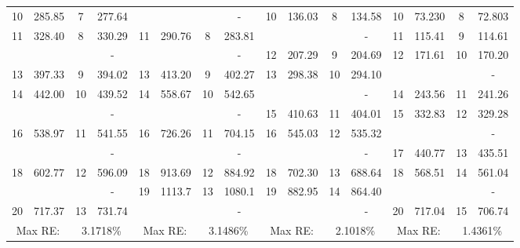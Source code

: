 \documentclass[../../main.tex]{subfiles}
\begin{document}
\begin{table}[h!]
{{\begin{tabular}{|cccc||cccc||cccc||cccc|}
		{10} & 285.85 & 7     & 277.64 & \cellcolor{lightgray}{10}    & \cellcolor{lightgray}{192.03} &      & {-} & 10    & 136.03 & 8     & 134.58 & 10    & 73.230 & 8     & 72.803 \\
		{11} & 328.40 & 8     & 330.29 & 11    & 290.76 & 8     & 283.81 & \cellcolor{lightgray}{11}    & \cellcolor{lightgray}{192.48} &       & {-} & 11    & 115.41 & 9     & 114.61 \\
		\cellcolor{lightgray}{12} & \cellcolor{lightgray}{357.08} &       & {-} & \cellcolor{lightgray}{12}    & \cellcolor{lightgray}{374.45} &       & {-} & 12    & 207.29 & 9     & 204.69 & 12    & 171.61 & 10    & 170.20 \\
		{13} & 397.33 & 9     & 394.02 & 13    & 413.20 & 9     & 402.27 & 13    & 298.38 & 10    & 294.10 & \cellcolor{lightgray}{13}    & \cellcolor{lightgray}{192.52} &       & {-} \\
		{14} & 442.00   & 10    & 439.52 & 14    & 558.67 & 10    & 542.65 & \cellcolor{lightgray}{14}    & \cellcolor{lightgray}{376.83} &       & {-} & 14    & 243.56 & 11    & 241.26 \\
		\cellcolor{lightgray}{15} & \cellcolor{lightgray}{533.71} &       & {-} & \cellcolor{lightgray}{15}    & \cellcolor{lightgray}{614.11} &       & {-} & 15    & 410.63 & 11    & 404.01 & 15    & 332.83 & 12    & 329.28 \\
		{16} & 538.97 & 11    & 541.55 & 16    & 726.26 & 11    & 704.15 & 16    & 545.03 & 12    & 535.32 & \cellcolor{lightgray}{16}    & \cellcolor{lightgray}{377.16} &       & {-} \\
		\cellcolor{lightgray}{17} & \cellcolor{lightgray}{596.06} &       & {-} & \cellcolor{lightgray}{17}    & \cellcolor{lightgray}{906.28} &       & {-} & \cellcolor{lightgray}{17}    & \cellcolor{lightgray}{621.95} &       & {-} & 17    & 440.77 & 13    & 435.51 \\
		{18} & 602.77 & 12    & 596.09 & 18    & 913.69 & 12    & 884.92 & 18    & 702.30 & 13    & 688.64 & 18    & 568.51 & 14    & 561.04 \\
		\cellcolor{lightgray}{19} & \cellcolor{lightgray}{657.87} &       & {-} & 19    & 1113.7 & 13    & 1080.1 & 19    & 882.95 & 14    & 864.40 & \cellcolor{lightgray}{19}    & \cellcolor{lightgray}{623.05} &       & {-} \\
		{20} & 717.37 & 13    & 731.74 & \cellcolor{lightgray}{20}    & \cellcolor{lightgray}{1218.0}  &       & {-} & \cellcolor{lightgray}{20}    & \cellcolor{lightgray}{927.18} &       & {-} & 20    & 717.04 & 15    & 706.74 \\
		\hline
		\multicolumn{2}{|c}{Max RE:} & \multicolumn{2}{c||}{3.1718\%} & \multicolumn{2}{c}{Max RE:} & \multicolumn{2}{c||}{3.1486\%} & \multicolumn{2}{c}{Max RE:} & \multicolumn{2}{c||}{2.1018\%} & \multicolumn{2}{c}{Max RE:} & \multicolumn{2}{c|}{1.4361\%} \\
		\hline
	\end{tabular}%
	\label{tab:Timo}%
}
}
\end{table}%
\FloatBarrier
\end{document}
